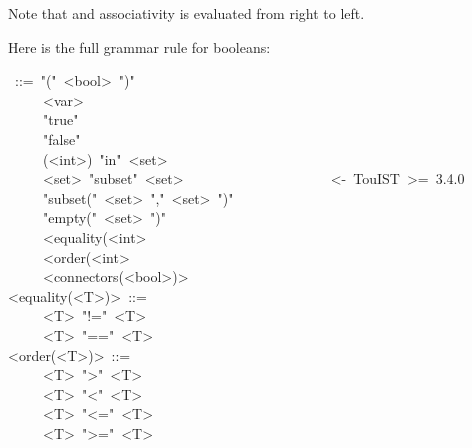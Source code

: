 {\noindent Note that \mdcode{=\textgreater{}} and \mdcode{\textless{}=\textgreater{}} associativity is evaluated from right to left.%

Here is the full grammar rule for booleans:%
\begin{mdpre}%
~::=~"("~{\textless{}bool\textgreater{}}~")"\\
~~~~\textbar{}~{\textless{}var\textgreater{}}\\
~~~~\textbar{}~"true"\\
~~~~\textbar{}~"false"\\
~~~~\textbar{}~({\textless{}int\textgreater{}})~"in"~{\textless{}set\textgreater{}}\\
~~~~\textbar{}~{\textless{}set\textgreater{}}~"subset"~{\textless{}set\textgreater{}}~~~~~~~~~~~~~~~~~~~~~{\textless{}-~TouIST~\textgreater{}=~3.4.0}\\
~~~~\textbar{}~"subset("~{\textless{}set\textgreater{}}~","~{\textless{}set\textgreater{}}~")"\\
~~~~\textbar{}~"empty("~{\textless{}set\textgreater{}}~")"\\
~~~~\textbar{}~{\textless{}equality(\textless{}int\textgreater{}}\\
~~~~\textbar{}~{\textless{}order(\textless{}int\textgreater{}}\\
~~~~\textbar{}~{\textless{}connectors(\textless{}bool\textgreater{})\textgreater{}}\\
{\textless{}equality(\textless{}T\textgreater{})\textgreater{}}~::=\\
~~~~\textbar{}~{\textless{}T\textgreater{}}~"!="~{\textless{}T\textgreater{}}\\
~~~~\textbar{}~{\textless{}T\textgreater{}}~"=="~{\textless{}T\textgreater{}}\\
{\textless{}order(\textless{}T\textgreater{})\textgreater{}}~::=\\
~~~~\textbar{}~{\textless{}T\textgreater{}}~"\textgreater{}"~{\textless{}T\textgreater{}}\\
~~~~\textbar{}~{\textless{}T\textgreater{}}~"\textless{}"~{\textless{}T\textgreater{}}\\
~~~~\textbar{}~{\textless{}T\textgreater{}}~"\textless{}="~{\textless{}T\textgreater{}}\\
~~~~\textbar{}~{\textless{}T\textgreater{}}~"\textgreater{}="~{\textless{}T\textgreater{}}%
\end{mdpre}
}
